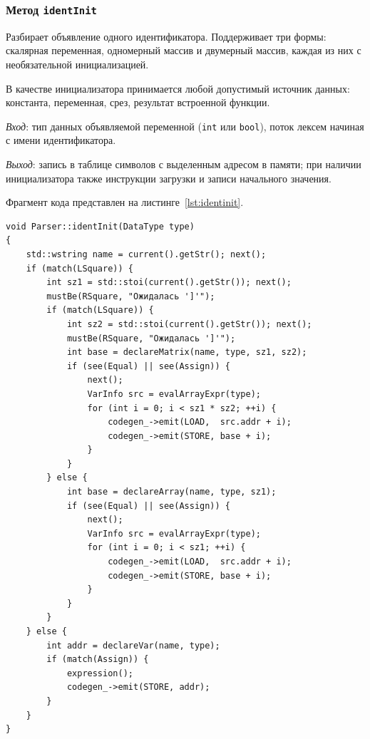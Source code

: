 \documentclass[a4paper,final]{article}
\begin{document}
\subsubsection*{Метод \texttt{identInit}}

Разбирает объявление одного идентификатора. Поддерживает три формы:
скалярная переменная, одномерный массив и двумерный массив,
каждая из них с необязательной инициализацией. 

В качестве инициализатора
принимается любой допустимый источник данных: константа, переменная,
срез, результат встроенной функции.

\textit{Вход}: тип данных объявляемой переменной (\texttt{int} или \texttt{bool}),
поток лексем начиная с имени идентификатора.

\textit{Выход}: запись в таблице символов с выделенным адресом в памяти; при
наличии инициализатора также инструкции загрузки и записи начального значения.

Фрагмент кода представлен на листинге~\ref{lst:identinit}.

\begin{lstlisting}[caption={Метод Parser::identInit (фрагмент)}, label=lst:identinit]
void Parser::identInit(DataType type)
{
    std::wstring name = current().getStr(); next();
    if (match(LSquare)) {
        int sz1 = std::stoi(current().getStr()); next();
        mustBe(RSquare, "Ожидалась ']'");
        if (match(LSquare)) {
            int sz2 = std::stoi(current().getStr()); next();
            mustBe(RSquare, "Ожидалась ']'");
            int base = declareMatrix(name, type, sz1, sz2);
            if (see(Equal) || see(Assign)) {
                next();
                VarInfo src = evalArrayExpr(type);
                for (int i = 0; i < sz1 * sz2; ++i) {
                    codegen_->emit(LOAD,  src.addr + i);
                    codegen_->emit(STORE, base + i);
                }
            }
        } else {
            int base = declareArray(name, type, sz1);
            if (see(Equal) || see(Assign)) {
                next();
                VarInfo src = evalArrayExpr(type);
                for (int i = 0; i < sz1; ++i) {
                    codegen_->emit(LOAD,  src.addr + i);
                    codegen_->emit(STORE, base + i);
                }
            }
        }
    } else {
        int addr = declareVar(name, type);
        if (match(Assign)) {
            expression();
            codegen_->emit(STORE, addr);
        }
    }
}
\end{lstlisting}
\end{document}
